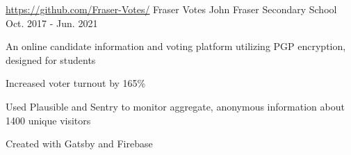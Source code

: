 

\begin{cventries}

  \cventry
    {\url{https://github.com/Fraser-Votes/}} %
    {Fraser Votes} %
    {John Fraser Secondary School} %
    {Oct. 2017 - Jun. 2021} %
    {
      \begin{cvitems} %
		\item {An online candidate information and voting platform utilizing PGP encryption, designed for students}
		\item {Increased voter turnout by 165\%}
		\item {Used Plausible and Sentry to monitor aggregate, anonymous information about 1400 unique visitors}
		\item {Created with Gatsby and Firebase}
      \end{cvitems}
    }


\end{cventries}
